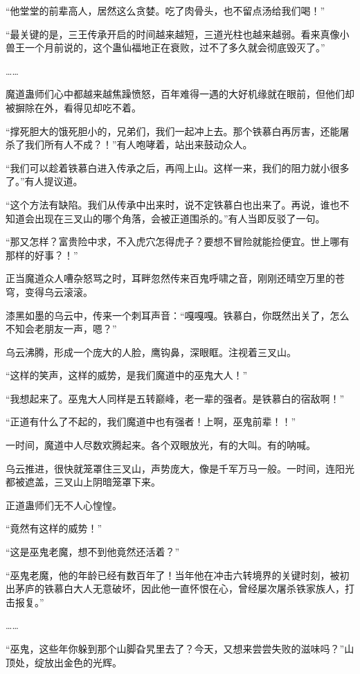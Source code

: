 \begin{this_body}
“他堂堂的前辈高人，居然这么贪婪。吃了肉骨头，也不留点汤给我们喝！”

“最关键的是，三王传承开启的时间越来越短，三道光柱也越来越弱。看来真像小兽王一个月前说的，这个蛊仙福地正在衰败，过不了多久就会彻底毁灭了。”

……

魔道蛊师们心中都越来越焦躁愤怒，百年难得一遇的大好机缘就在眼前，但他们却被摒除在外，看得见却吃不着。

“撑死胆大的饿死胆小的，兄弟们，我们一起冲上去。那个铁慕白再厉害，还能屠杀了我们所有人不成？！”有人咆哮着，站出来鼓动众人。

“我们可以趁着铁慕白进入传承之后，再闯上山。这样一来，我们的阻力就小很多了。”有人提议道。

“这个方法有缺陷。我们从传承中出来时，说不定铁慕白也出来了。再说，谁也不知道会出现在三叉山的哪个角落，会被正道围杀的。”有人当即反驳了一句。

“那又怎样？富贵险中求，不入虎穴怎得虎子？要想不冒险就能捡便宜。世上哪有那样的好事？！”

正当魔道众人嘈杂怒骂之时，耳畔忽然传来百鬼呼啸之音，刚刚还晴空万里的苍穹，变得乌云滚滚。

漆黑如墨的乌云中，传来一个刺耳声音：“嘎嘎嘎。铁慕白，你既然出关了，怎么不知会老朋友一声，嗯？”

乌云沸腾，形成一个庞大的人脸，鹰钩鼻，深眼眶。注视着三叉山。

“这样的笑声，这样的威势，是我们魔道中的巫鬼大人！”

“我想起来了。巫鬼大人同样是五转巅峰，老一辈的强者。是铁慕白的宿敌啊！”

“正道有什么了不起的，我们魔道中也有强者！上啊，巫鬼前辈！！”

一时间，魔道中人尽数欢腾起来。各个双眼放光，有的大叫。有的呐喊。

乌云推进，很快就笼罩住三叉山，声势庞大，像是千军万马一般。一时间，连阳光都被遮盖，三叉山上阴暗笼罩下来。

正道蛊师们无不人心惶惶。

“竟然有这样的威势！”

“这是巫鬼老魔，想不到他竟然还活着？”

“巫鬼老魔，他的年龄已经有数百年了！当年他在冲击六转境界的关键时刻，被初出茅庐的铁慕白大人无意破坏，因此他一直怀恨在心，曾经屡次屠杀铁家族人，打击报复。”

……

“巫鬼，这些年你躲到那个山脚旮旯里去了？今天，又想来尝尝失败的滋味吗？”山顶处，绽放出金色的光辉。


\end{this_body}
